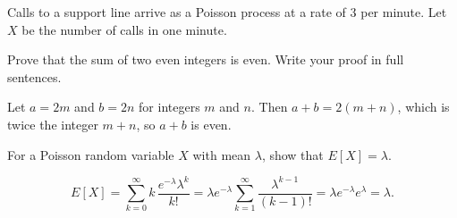 \documentclass[11pt,addpoints,answers]{exam}
\begin{document}
\begin{questions}
  \question[12] Calls to a support line arrive as a Poisson process at a rate of
  3 per minute. Let $X$ be the number of calls in one minute.

  \question[10] Prove that the sum of two even integers is even. Write your
  proof in full sentences.
  \begin{solution}
    Let $a = 2m$ and $b = 2n$ for integers $m$ and $n$. Then
    $a + b = 2(m+n)$, which is twice the integer $m+n$, so $a+b$ is even.
  \end{solution}

  \bonusquestion[5] For a Poisson random variable $X$ with mean $\lambda$, show that $E[X] = \lambda$.
  \begin{solution}
    \[
      E[X] = \sum_{k=0}^{\infty} k\,\frac{e^{-\lambda}\lambda^k}{k!}
      = \lambda e^{-\lambda} \sum_{k=1}^{\infty} \frac{\lambda^{k-1}}{(k-1)!}
      = \lambda e^{-\lambda} e^{\lambda} = \lambda.
    \]
  \end{solution}

\end{questions}

\vspace{1em}

\gradetable[h][questions]
\end{document}
